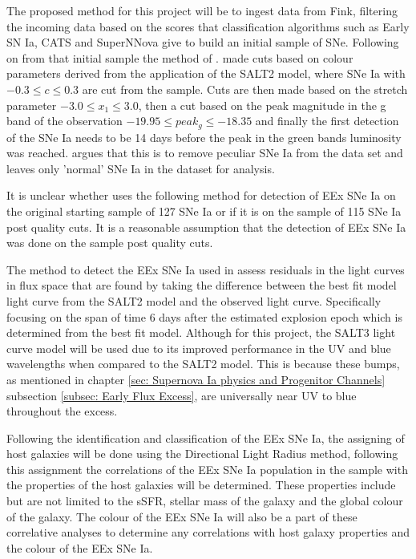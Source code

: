 The proposed method for this project will be to ingest data from Fink, filtering the incoming data based on the scores that classification algorithms such as Early SN Ia, CATS and SuperNNova give to build an initial sample of SNe. Following on from that initial sample the method of \textcite{deckers_constraining_2022}. \textcite{deckers_constraining_2022} made cuts based on colour parameters derived from the application of the SALT2 model, where SNe Ia with \(-0.3 \leq c \leq 0.3\) are cut from the sample. Cuts are then made based on the stretch parameter \(-3.0\leq x_1\leq 3.0\), then a cut based on the peak magnitude in the g band of the observation \(-19.95\leq peak_g\leq-18.35\) and finally the first detection of the SNe Ia needs to be 14 days before the peak in the green bands luminosity was reached. \textcite{deckers_constraining_2022} argues that this is to remove peculiar SNe Ia from the data set and leaves only 'normal' SNe Ia in the dataset for analysis. 

It is unclear whether \textcite{deckers_constraining_2022} uses the following method for detection of EEx SNe Ia on the original starting sample of 127 SNe Ia or if it is on the sample of 115 SNe Ia post quality cuts. It is a reasonable assumption that the detection of EEx SNe Ia was done on the sample post quality cuts. 

The method to detect the EEx SNe Ia used in \textcite{deckers_constraining_2022} assess residuals in the light curves in flux space that are found by taking the difference between the best fit model light curve from the SALT2 model and the observed light curve. Specifically focusing on the span of time 6 days after the estimated explosion epoch which is determined from the best fit model. Although for this project, the SALT3 light curve model will be used due to its improved performance in the UV and blue wavelengths when compared to the SALT2 model. This is because these bumps, as mentioned in chapter \ref{sec: Supernova Ia physics and Progenitor Channels} subsection \ref{subsec: Early Flux Excess}, are universally near UV to blue throughout the excess.

Following the identification and classification of the EEx SNe Ia, the assigning of host galaxies will be done using the Directional Light Radius method, following this assignment the correlations of the EEx SNe Ia population in the sample with the properties of the host galaxies will be determined. These properties include but are not limited to the sSFR, stellar mass of the galaxy and the global colour of the galaxy. The colour of the EEx SNe Ia will also be a part of these correlative analyses to determine any correlations with host galaxy properties and the colour of the EEx SNe Ia. 